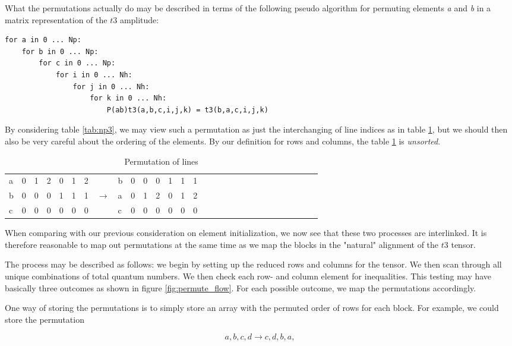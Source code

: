What the permutations actually do may be described in terms of the following pseudo algorithm for permuting elements \emph{a} and \emph{b} in a matrix representation of the $t3$ amplitude:

\begin{verbatim}
for a in 0 ... Np:
    for b in 0 ... Np:
        for c in 0 ... Np:
            for i in 0 ... Nh:
                for j in 0 ... Nh:
                    for k in 0 ... Nh:
                        P(ab)t3(a,b,c,i,j,k) = t3(b,a,c,i,j,k)
\end{verbatim}

By considering table \ref{tab:np3}, we may view such a permutation as just the interchanging of line indices as in table \ref{tab:np33}, but we should then also be very careful about the ordering of the elements. By our definition for rows and columns, the table \ref{tab:np33} is \emph{unsorted}. 

\begin{table}[]
\centering
\caption{Permutation of lines }
\label{tab:np33}
\begin{tabular}{lllllllllllllllllllllllllllll}
a &0&  1&  2&  0&  1&  2& &b & 0&  0&  0&  1&  1&  1&   \\
b & 0&  0&  0&  1&  1&  1& $\rightarrow $&a &0&  1&  2&  0&  1&  2& \\
c & 0&  0&  0&  0&  0&  0&&c & 0&  0&  0&  0&  0&  0& \\
\end{tabular}
\end{table}

When comparing with our previous consideration on element initialization, we now see that these two processes are interlinked. It is therefore reasonable to map out permutations at the same time as we map the blocks in the "natural" alignment of the $t3$ tensor.

The process may be described as follows: we begin by setting up the reduced rows and columns for the tensor. We then scan through all unique combinations of total quantum numbers. We then check each row- and column element for inequalities. This testing may have basically three outcomes as shown in figure \ref{fig:permute_flow}. For each possible outcome, we map the permutations accordingly. 

One way of storing the permutations is to simply store an array with the permuted order of rows for each block. For example, we could store the permutation

\begin{equation}
a, b, c, d \rightarrow c, d, b, a,
\end{equation}

